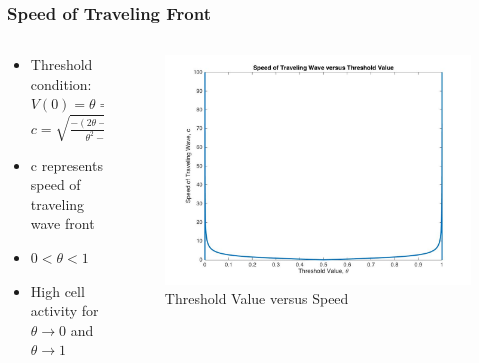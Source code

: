 \documentclass{beamer}
\begin{document}
\begin{frame}
\frametitle{Speed of Traveling Front}
\begin{columns}
\begin{column}{.5\textwidth}
\begin{itemize}
	\item Threshold condition: $V(0)=\theta \Rightarrow$\\$c=\sqrt{\frac{-(2\theta-1)^2}{\theta^2-\theta}}$
	\item c represents speed of traveling wave front
	\item $0<\theta<1$
	\item High cell activity for $\theta\rightarrow0$ and $\theta\rightarrow1$
\end{itemize}
\end{column}
\begin{column}{.6\textwidth}
\begin{figure}
\includegraphics[scale=0.17]{thresholdSpeed1}
\caption{Threshold Value versus Speed}
\end{figure}
\end{column}
\end{columns}
\end{frame}
\end{document}
